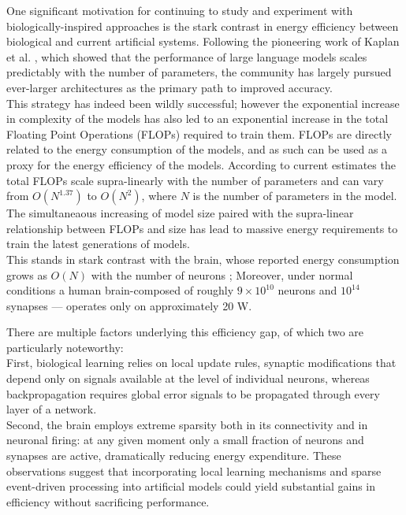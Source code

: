 \documentclass[a4paper,12pt]{report}
\begin{document}
One significant motivation for continuing to study and experiment with biologically-inspired 
approaches is the stark contrast in energy efficiency between biological and current 
artificial systems. 
Following the pioneering work of Kaplan et al. \cite{kaplan2020scalinglawsneurallanguage}, which 
showed that the performance of large language models scales predictably with the number of parameters, 
the community has largely pursued ever-larger architectures as the primary path to improved 
accuracy. \\
This strategy has indeed been wildly successful; however the exponential increase in complexity of the 
models has also led to an exponential increase in the total Floating Point Operations (FLOPs) 
required to train them. FLOPs are directly related to the energy consumption of the models, 
and as such can be used as a proxy for the energy efficiency of the models. According to current 
estimates \cite{kaplan2020scalinglawsneurallanguage, hoffmann2022trainingcomputeoptimallargelanguage}
 the total FLOPs scale supra-linearly with the 
number of parameters and can vary from $O(N^{1.37})$ to $O(N^2)$, where $N$ is the number of 
parameters in the model. The simultaneaous increasing of model size paired with the supra-linear 
relationship between FLOPs and size has lead to massive energy requirements to train the latest 
generations of models. \\
This stands in stark contrast with the brain, whose reported energy consumption grows as 
$O(N)$ with the number of neurons \cite{10.1371/journal.pone.0017514}; Moreover, under normal 
conditions a human brain-composed of roughly $9\times10^{10}$ neurons and $10^{14}$ synapses --- 
operates only on approximately 20 W\cite{doi:10.1097/00004647-200110000-00001}.

There are multiple factors underlying this efficiency gap, of which two are particularly noteworthy: \\
First, biological learning relies on local update rules, synaptic modifications that depend only 
on signals available at the level of individual neurons, whereas backpropagation requires global 
error signals to be propagated through every layer of a network\cite{Xu2024}. \\
Second, the brain employs extreme sparsity both in its connectivity and in neuronal firing: at any 
given moment only a small fraction of neurons and synapses are active, dramatically reducing energy 
expenditure. These observations suggest that incorporating local learning mechanisms and sparse 
event-driven processing into artificial models could yield substantial gains in efficiency without 
sacrificing performance.
\end{document}

